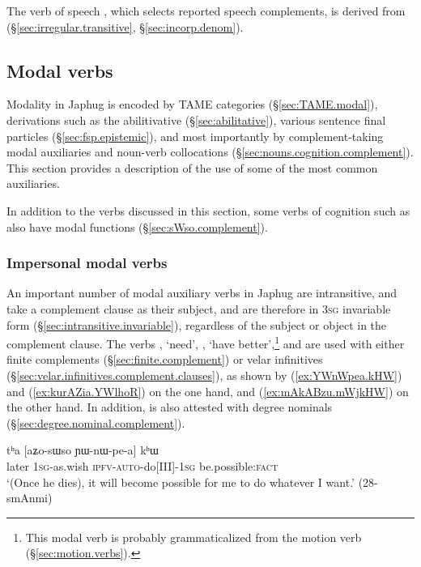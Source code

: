 The verb of speech , which selects reported speech complements, is derived from  (§\ref{sec:irregular.transitive}, §\ref{sec:incorp.denom}).

 \subsection{Modal verbs}
   
Modality in Japhug is encoded by TAME categories (§\ref{sec:TAME.modal}), derivations such as the abilitivative (§\ref{sec:abilitative}), various sentence final particles (§\ref{sec:fsp.epistemic}), and most importantly by com\-ple\-ment-taking modal auxiliaries and noun-verb collocations (§\ref{sec:nouns.cognition.complement}). This section provides a description of the use of some of the most common auxiliaries. 
  
In addition to the verbs discussed in this section, some verbs of cognition such as   also have modal functions (§\ref{sec:sWso.complement}).


 \subsubsection{Impersonal modal verbs} \label{sec:ra.khW.jAG.verb}
An important number of modal auxiliary verbs in Japhug are intransitive, and take a complement clause as their subject, and are therefore in \textsc{3sg} invariable form (§\ref{sec:intransitive.invariable}), regardless of the subject or object in the complement clause. The verbs , `need', , `have better',\footnote{This modal verb is probably grammaticalized from the motion verb (§\ref{sec:motion.verbs}).} and  are used with either finite complements (§\ref{sec:finite.complement}) or velar infinitives (§\ref{sec:velar.infinitives.complement.clauses}), as shown by (\ref{ex:YWnWpea.kHW}) and (\ref{ex:kurAZia.YWlhoR}) on the one hand, and (\ref{ex:mAkABzu.mWjkHW}) on the other hand. In addition,  is also attested with degree nominals (§\ref{sec:degree.nominal.complement}).

\begin{exe} 
\ex \label{ex:YWnWpea.kHW}
\gll tʰa [aʑo-sɯso ɲɯ-nɯ-pe-a] kʰɯ \\
later \textsc{1sg}-as.wish \textsc{ipfv}-\textsc{auto}-do[III]-\textsc{1sg} be.possible:\textsc{fact} \\
\glt `(Once he dies), it will become possible for me to do whatever I want.' (28-smAnmi)
\end{exe} 

